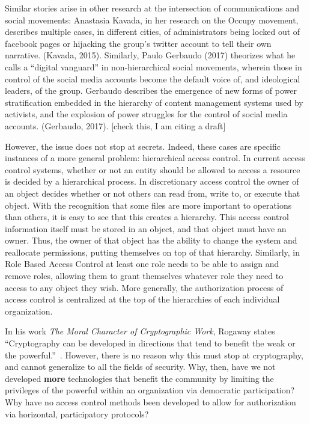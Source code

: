 Similar stories arise in other research at the intersection of communications
and social movements: Anastasia Kavada, in her research on the Occupy movement,
describes multiple cases, in different cities, of administrators being locked
out of facebook pages or hijacking the group’s twitter account to tell their own
narrative. (Kavada, 2015). Similarly, Paulo Gerbaudo (2017) theorizes what he
calls a ``digital vanguard'' in non-hierarchical social movements, wherein those
in control of the social media accounts become the default voice of, and
ideological leaders, of the group. Gerbaudo describes the emergence of new
forms of power stratification embedded in the hierarchy of content management
systems used by activists, and the explosion of power struggles for the control
of social media accounts. (Gerbaudo, 2017). [check this, I am citing a draft]

However, the issue does not stop at secrets. Indeed, these cases are specific
instances of a more general problem: hierarchical access control. In current
access control systems, whether or not an entity should be allowed to access
a resource is decided by a hierarchical process. In discretionary access control
the owner of an object decides whether or not others can read from, write to, or
execute that object. With the recognition that some files are more important to
operations than others, it is easy to see that this creates a hierarchy. This
access control information itself must be stored in an object, and that object
must have an owner. Thus, the owner of that object has the ability to change the
system and reallocate permissions, putting themselves on top of that hierarchy.
Similarly, in Role Based Access Control at least one role needs to be able to
assign and remove roles, allowing them to grant themselves whatever role they
need to access to any object they wish. More generally, the authorization
process of access control is centralized at the top of the hierarchies of each
individual organization.

In his work \textit{The Moral Character of Cryptographic Work}, Rogaway states
``Cryptography can be developed in directions that tend to benefit the weak or
the powerful.''~\cite{rogaway2015moral}. However, there is no reason why this
must stop at cryptography, and cannot generalize to all the fields of security.
Why, then, have we not developed \textbf{more} technologies that benefit the
community by limiting the privileges of the powerful within an organization via
democratic participation? Why have no access control methods been developed to
allow for authorization via horizontal, participatory protocols?

